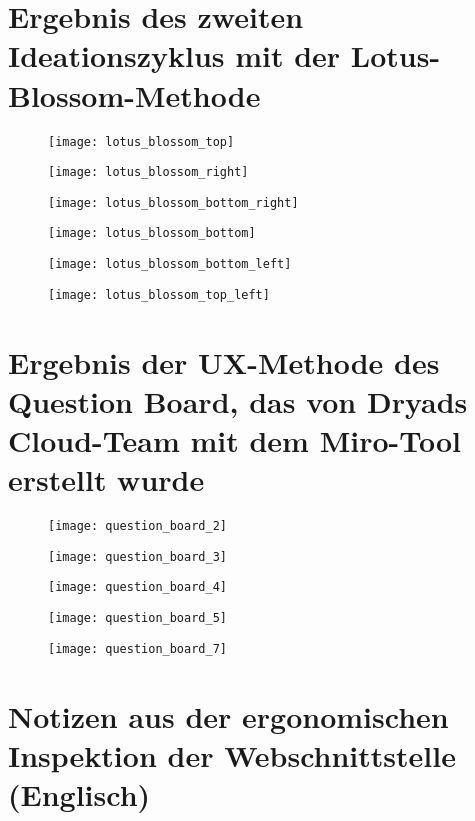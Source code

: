 
\section{Ergebnis des zweiten Ideationszyklus mit der Lotus-Blossom-Methode} \label{appendix:lotus_blossom}

\begin{figure}[H]
  \centering
  \texttt{[image: lotus\_blossom\_top]}
  \caption{}
  \label{fig:lotus_blossom_top}
\end{figure}
\begin{figure}[H]
  \centering
  \texttt{[image: lotus\_blossom\_right]}
  \caption{}
  \label{fig:lotus_blossom_right}
\end{figure}
\begin{figure}[H]
  \centering
  \texttt{[image: lotus\_blossom\_bottom\_right]}
  \caption{}
  \label{fig:lotus_blossom_bottom_right}
\end{figure}
\begin{figure}[H]
  \centering
  \texttt{[image: lotus\_blossom\_bottom]}
  \caption{}
  \label{fig:lotus_blossom_bottom}
\end{figure}
\begin{figure}[H]
  \centering
  \texttt{[image: lotus\_blossom\_bottom\_left]}
  \caption{}
  \label{fig:lotus_blossom_bottom_left}
\end{figure}
\begin{figure}[H]
  \centering
  \texttt{[image: lotus\_blossom\_top\_left]}
  \caption{}
  \label{fig:lotus_blossom_top_left}
\end{figure}

\section{Ergebnis der UX-Methode des Question Board, das von Dryads Cloud-Team mit dem Miro-Tool erstellt wurde} \label{appendix:question_board}

\begin{figure}[H]
  \centering
  \texttt{[image: question\_board\_2]}
  \caption{}
  \label{fig:question_board_2}
\end{figure}
\begin{figure}[H]
  \centering
  \texttt{[image: question\_board\_3]}
  \caption{}
  \label{fig:question_board_3}
\end{figure}
\begin{figure}[H]
  \centering
  \texttt{[image: question\_board\_4]}
  \caption{}
  \label{fig:question_board_4}
\end{figure}
\begin{figure}[H]
  \centering
  \texttt{[image: question\_board\_5]}
  \caption{}
  \label{fig:question_board_5}
\end{figure}
\begin{figure}[H]
  \centering
  \texttt{[image: question\_board\_7]}
  \caption{}
  \label{fig:question_board_7}
\end{figure}

\section{Notizen aus der ergonomischen Inspektion der Webschnittstelle (Englisch)}



